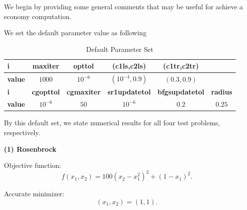 \documentclass[11pt]{report}
\begin{document}
We begin by providing some general comments that may be useful for achieve a economy computation. 

We set the default parameter value as following
\begin{table}[htpb]
    \caption{Default Parameter Set}
    \label{tab:default_para}
    \begin{center}
        \begin{tabular}{l|ccccc}
        \hline
        \hline
        \textbf{i} & \textbf{maxiter} & \textbf{opttol} & \textbf{(c1ls,c2ls)}& \textbf{(c1tr,c2tr)}\\
        \hline
             \textbf{value}& $1000$&$10^{-6}$ & $(10^{-4},0.9)$ &${(0.3,0.9)}$\\
        \hline
        \hline
        \textbf{i} & \textbf{cgopttol}& \textbf{cgmaxiter}& \textbf{sr1updatetol}& \textbf{bfgsupdatetol}& \textbf{radius} \\
        \hline
         \textbf{value}& $10^{-6}$& $50$ & $10^{-6}$ & $0.2$ &$0.25$\\
        \hline
        \hline
        \end{tabular}
    \end{center}
\end{table}

By this default set, we state numerical results for all four test problems, respectively.

\textbf{(1) Rosenbrock }

Objective function: 
\begin{equation}
    f(x_1,x_2) = 100(x_2-x_1^2)^2+(1-x_1)^2.
\end{equation}

Accurate minimizer:
\begin{equation}
    (x_1,x_2) = (1,1).
\end{equation}
\end{document}
